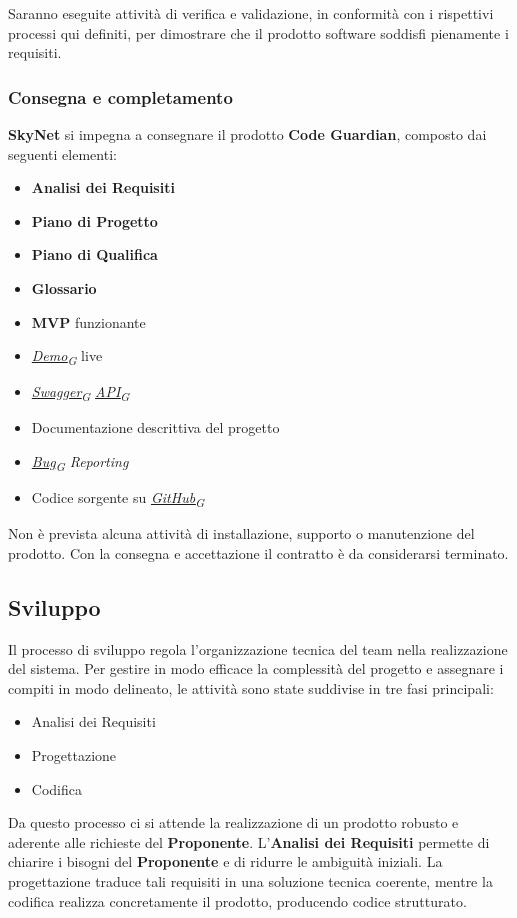 \documentclass[12pt, a4paper]{article}
\newcommand{\urlglossario}{https://skynetunigroup.github.io/Code_Guardian/Documentazione/PB/glossario_v2.0.0.pdf} %
\newcommand{\glo}[2]{\href{\urlglossario\#nameddest=#2}{#1\textsubscript{G}}}
\begin{document}
Saranno eseguite attività di verifica e validazione, in conformità con i rispettivi processi qui definiti, per dimostrare che il prodotto software soddisfi pienamente i requisiti.

\subsubsection{Consegna e completamento}
\textbf{SkyNet} si impegna a consegnare il prodotto \textbf{Code Guardian}, composto dai seguenti elementi:

\begin{itemize}
    \item \textbf{Analisi dei Requisiti}
    \item \textbf{Piano di Progetto}
    \item \textbf{Piano di Qualifica}
    \item \textbf{Glossario}
    \item \textbf{MVP} funzionante
    \item \textit{\glo{\textit{Demo}}{demo}} live
    \item \textit{\glo{Swagger}{swagger}} \textit{\glo{API}{api}}
    \item Documentazione descrittiva del progetto
    \item \textit{\glo{Bug}{bug} Reporting}
    \item Codice sorgente su \textit{\glo{GitHub}{github}}
\end{itemize}

Non è prevista alcuna attività di installazione, supporto o manutenzione del prodotto. Con la consegna e accettazione il contratto è da considerarsi terminato.

\subsection{Sviluppo}

Il processo di sviluppo regola l'organizzazione tecnica del team nella realizzazione del sistema. Per gestire in modo efficace la complessità del progetto e assegnare i compiti in modo delineato, le attività sono state suddivise in tre fasi principali:
\begin{itemize}
    \item Analisi dei Requisiti
    \item Progettazione
    \item Codifica
\end{itemize}

Da questo processo ci si attende la realizzazione di un prodotto robusto e aderente alle richieste del \textbf{Proponente}. L'\textbf{Analisi dei Requisiti} permette di chiarire i bisogni del \textbf{Proponente} e di ridurre le ambiguità iniziali. La progettazione traduce tali requisiti in una soluzione tecnica coerente, mentre la codifica realizza concretamente il prodotto, producendo codice strutturato.
\end{document}

